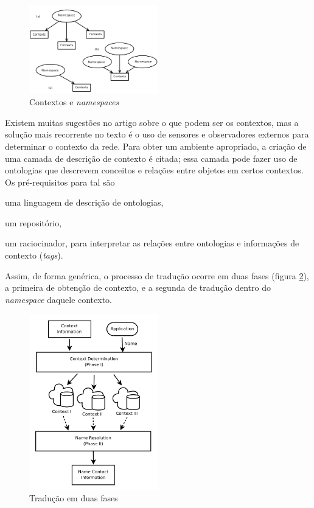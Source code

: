     \begin{figure}[h!]
        \centering
        \includegraphics[width=0.5\textwidth]{figures/contexts}
        \caption{Contextos e \textit{namespaces}}
        \label{namespaces}
    \end{figure}
    
    Existem muitas sugestões no artigo sobre o que podem ser os contextos, mas a
    solução mais recorrente no texto é o uso de sensores e observadores externos
    para determinar o contexto da rede. Para obter um ambiente apropriado, a
    criação de uma camada de descrição de contexto é citada; essa camada pode
    fazer uso de ontologias que descrevem conceitos e relações entre objetos
    em certos contextos. Os pré-requisitos para tal são
    \begin{inparaenum}[(i)]
        \item uma linguagem de descrição de ontologias,
        \item um repositório,
        \item um raciocinador, para interpretar as relações entre ontologias e
        informações de contexto (\textit{tags}).
    \end{inparaenum} 
    Assim, de forma genérica, o processo de tradução ocorre em duas fases
    (figura \ref{translation}), a primeira de obtenção de contexto, e a segunda
    de tradução dentro do \textit{namespace} daquele contexto.
    
    \begin{figure}[h!]
        \centering
        \includegraphics[width=0.5\textwidth]{figures/translation}
        \caption{Tradução em duas fases}
        \label{translation}
    \end{figure}
    
